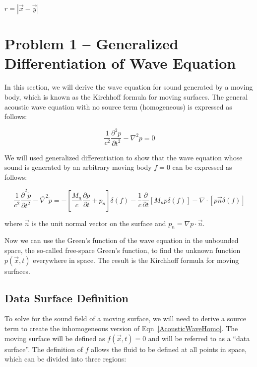 \documentclass[]{aiaa-tc}%
\begin{document}
$r=|\vec{x} - \vec{y}|$


\section{Problem 1 -- Generalized Differentiation of Wave Equation} \label{SecGenDiff}

In this section, we will derive the wave equation for sound generated by a moving body, which is known as the Kirchhoff formula for moving surfaces.  The general acoustic wave equation with no source term (homogeneous) is expressed as follows:

\begin{equation} \label{AcousticWaveHomo}
\dfrac{1}{c^2}\dfrac{\partial^2p}{\partial t^2} - \nabla^2p = 0
\end{equation}

We will used generalized differentiation to show that the wave equation whose sound is generated by an arbitrary moving body $f=0$ can be expressed as follows:

\begin{equation} \label{AcousticWaveBody}
\dfrac{1}{c^2}\dfrac{ \overline{\partial}^2 \widetilde{p} }{ \partial t^2}
    - \overline{\nabla}^2 \widetilde{p}
= -\left[ \dfrac{M_n}{c} \dfrac{\partial p}{\partial t} + p_n \right] \delta(f)
    -\dfrac{1}{c} \dfrac{\partial}{\partial t} \left[ M_n p \delta(f) \right]
    -\nabla \cdot \left[ p \vec{n} \delta(f) \right]
\end{equation}

\noindent where $\vec{n}$ is the unit normal vector on the surface and $p_n = \nabla p \cdot \vec{n}$.

Now we can use the Green’s function of the wave equation in the unbounded space, the so-called free-space Green’s function, to find the unknown function $p(\vec{x},t)$   everywhere in space. The result is the Kirchhoff formula for moving surfaces.


\subsection{Data Surface Definition}

To solve for the sound field of a moving surface, we will need to derive a source term to create the inhomogeneous version of Eqn~\ref{AcousticWaveHomo}.  The moving surface will be defined as $f(\vec{x},t) = 0$ and will be referred to as a ``data surface''.  The definition of $f$ allows the fluid to be defined at all points in space, which can be divided into three regions:
\end{document}
